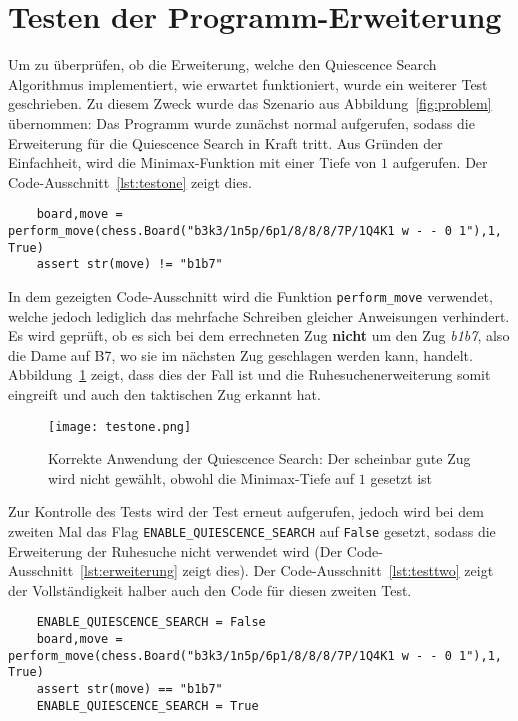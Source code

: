 \section{Testen der Programm-Erweiterung}
Um zu überprüfen, ob die Erweiterung, welche den Quiescence Search Algorithmus implementiert, wie erwartet funktioniert, wurde ein weiterer Test geschrieben. Zu diesem Zweck wurde das Szenario aus Abbildung~\ref{fig:problem} übernommen: Das Programm wurde zunächst normal aufgerufen, sodass die Erweiterung für die Quiescence Search in Kraft tritt. Aus Gründen der Einfachheit, wird die Minimax-Funktion mit einer Tiefe von $1$ aufgerufen. Der Code-Ausschnitt~\ref{lst:testone} zeigt dies.

\begin{lstlisting}[caption=Test für die Quiescence Search (normaler Aufruf), label=lst:testone]
	%%time
	board,move = perform_move(chess.Board("b3k3/1n5p/6p1/8/8/8/7P/1Q4K1 w - - 0 1"),1, True)
	assert str(move) != "b1b7"
\end{lstlisting}

In dem gezeigten Code-Ausschnitt wird die Funktion \texttt{perform\_move} verwendet, welche jedoch lediglich das mehrfache Schreiben gleicher Anweisungen verhindert. Es wird geprüft, ob es sich bei dem errechneten Zug \textbf{nicht} um den Zug \textit{b1b7}, also die Dame auf B7, wo sie im nächsten Zug geschlagen werden kann, handelt. Abbildung~\ref{fig:testone} zeigt, dass dies der Fall ist und die Ruhesuchenerweiterung somit eingreift und auch den taktischen Zug erkannt hat.

\begin{figure}[H]
	\texttt{[image: testone.png]}
	\caption{Korrekte Anwendung der Quiescence Search: Der scheinbar gute Zug wird nicht gewählt, obwohl die Minimax-Tiefe auf $1$ gesetzt ist}
	\label{fig:testone}
\end{figure}

Zur Kontrolle des Tests wird der Test erneut aufgerufen, jedoch wird bei dem zweiten Mal das Flag \texttt{ENABLE\_QUIESCENCE\_SEARCH} auf \texttt{False} gesetzt, sodass die Erweiterung der Ruhesuche nicht verwendet wird (Der Code-Ausschnitt~\ref{lst:erweiterung} zeigt dies). Der Code-Ausschnitt~\ref{lst:testtwo} zeigt der Vollständigkeit halber auch den Code für diesen zweiten Test.

\begin{lstlisting}[caption=Test für die Quiescence Search (Aufruf mit deaktivierter Ruhesuche), label=lst:testtwo]
	%%time
	ENABLE_QUIESCENCE_SEARCH = False
	board,move = perform_move(chess.Board("b3k3/1n5p/6p1/8/8/8/7P/1Q4K1 w - - 0 1"),1, True)
	assert str(move) == "b1b7"
	ENABLE_QUIESCENCE_SEARCH = True
\end{lstlisting}

